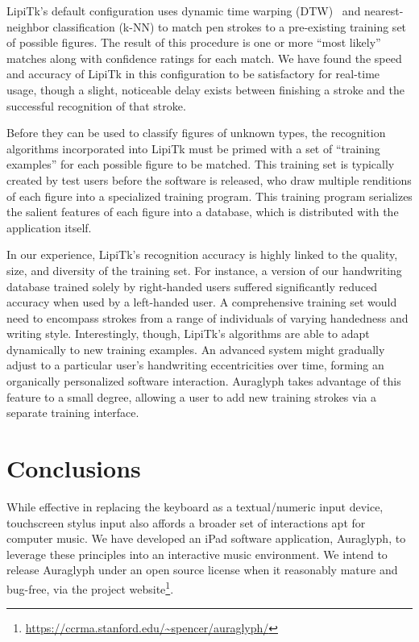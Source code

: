 \documentclass{nime-alternate}
\begin{document}
LipiTk's default configuration uses dynamic time warping (DTW)~\cite{niels2005using} and nearest-neighbor classification (k-NN) to match pen strokes to a pre-existing training set of possible figures. 
The result of this procedure is one or more ``most likely'' matches along with confidence ratings for each match. 
We have found the speed and accuracy of LipiTk in this configuration to be satisfactory for real-time usage, though a slight, noticeable delay exists between finishing a stroke and the successful recognition of that stroke. 

Before they can be used to classify figures of unknown types, the recognition algorithms incorporated into LipiTk must be primed with a set of ``training examples'' for each possible figure to be matched. 
This training set is typically created by test users before the software is released, who draw multiple renditions of each figure into a specialized training program. 
This training program serializes the salient features of each figure into a database, which is distributed with the application itself. 

In our experience, LipiTk's recognition accuracy is highly linked to the quality, size, and diversity of the training set. 
For instance, a version of our handwriting database trained solely by right-handed users suffered significantly reduced accuracy when used by a left-handed user. 
A comprehensive training set would need to encompass strokes from a range of individuals of varying handedness and writing style. 
Interestingly, though, LipiTk's algorithms are able to adapt dynamically to new training examples. 
An advanced system might gradually adjust to a particular user's handwriting eccentricities over time, forming an organically personalized software interaction. 
Auraglyph takes advantage of this feature to a small degree, allowing a user to add new training strokes via a separate training interface. 

\section{Conclusions}
\label{sec:Conclusions}

While effective in replacing the keyboard as a textual/numeric input device, touchscreen stylus input also affords a broader set of interactions apt for computer music. 
We have developed an iPad software application, Auraglyph, to leverage these principles into an interactive music environment. 
We intend to release Auraglyph under an open source license when it reasonably mature and bug-free, via the project website\footnote{\url{https://ccrma.stanford.edu/~spencer/auraglyph/}}.
\end{document}
